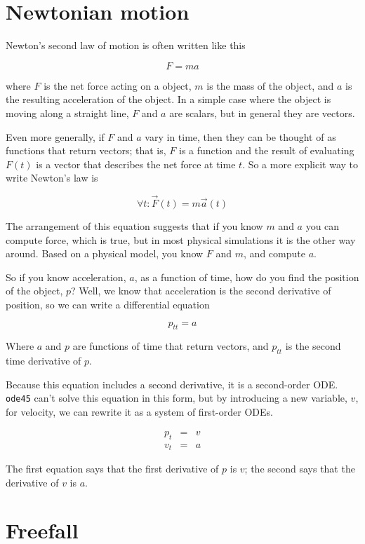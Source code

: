 \documentclass{book}
\begin{document}
\section{Newtonian motion}

Newton's second law of motion is often written like this

\[ F = ma \]

where $F$ is the net force acting on a object, $m$ is the mass
of the object, and $a$ is the resulting acceleration of the object.
In a simple case where the object is moving along a straight line,
$F$ and $a$ are scalars, but in general they are vectors.

Even more generally, if $F$ and $a$ vary in time, then they can
be thought of as functions that return vectors; that is, $F$ is
a function and the result of evaluating $F(t)$ is a vector that
describes the net force at time $t$. So a more explicit way to
write Newton's law is

\[ \forall t: \vec{F}(t) = m \vec{a}(t) \]

The arrangement of this equation suggests that if you know $m$ and $a$
you can compute force, which is true, but in most physical
simulations it is the other way around. Based on a physical
model, you know $F$ and $m$, and compute $a$.

So if you know acceleration, $a$, as a function of time, how do you
find the position of the object, $p$? Well, we know that acceleration
is the second derivative of position, so we can write a differential
equation

\[ p_{tt} = a \]

Where $a$ and $p$ are functions of time that return vectors,
and $p_{tt}$ is the second time derivative of $p$.

Because this equation includes a second derivative, it is a second-order
ODE. {\tt ode45} can't solve this equation in this form, but by
introducing a new variable, $v$, for velocity, we can rewrite it as
a system of first-order ODEs.

\begin{eqnarray*}
p_t &=& v \\
v_t &=& a
\end{eqnarray*}

The first equation says that the first derivative of $p$ is $v$; the
second says that the derivative of $v$ is $a$.


\section{Freefall}
\label{freefall}
\end{document}
